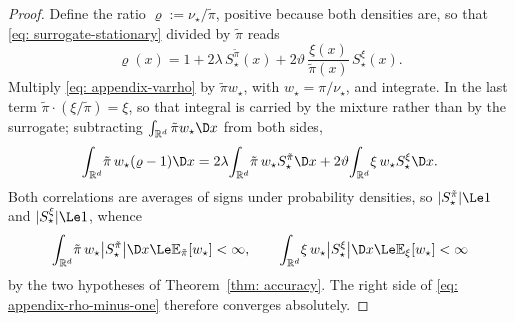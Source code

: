 \documentclass{article}
\begin{document}
\begin{proof}
Define the ratio $\varrho := \nu_\star/\tilde\pi$, positive because both densities are, so that \eqref{eq: surrogate-stationary} divided by $\tilde\pi$ reads
\begin{equation}
    \varrho(x) = 1 + 2\lambda\,S^{\tilde\pi}_\star(x) + 2\vartheta\,\frac{\xi(x)}{\tilde\pi(x)}\,S^{\xi}_\star(x) .
    \label{eq: appendix-varrho}
\end{equation}
Multiply \eqref{eq: appendix-varrho} by $\tilde\pi w_\star$, with $w_\star=\pi/\nu_\star$, and integrate. In the last term $\tilde\pi\cdot(\xi/\tilde\pi)=\xi$, so that integral is carried by the mixture rather than by the surrogate; subtracting $\int_{\mathbb R^d}\tilde\pi w_\star\D x$ from both sides,
\begin{equation}
    \int_{\mathbb R^d}\!\tilde\pi\,w_\star(\varrho-1)\D x
    = 2\lambda\!\int_{\mathbb R^d}\!\tilde\pi\,w_\star S^{\tilde\pi}_\star\D x
    + 2\vartheta\!\int_{\mathbb R^d}\!\xi\,w_\star S^{\xi}_\star\D x .
    \label{eq: appendix-rho-minus-one}
\end{equation}
Both correlations are averages of signs under probability densities, so $|S^{\tilde\pi}_\star|\Le1$ and $|S^{\xi}_\star|\Le1$, whence
\begin{equation*}
	\int_{\mathbb R^d}\!\tilde\pi\,w_\star\bigl|S^{\tilde\pi}_\star\bigr|\D x \Le \mathbb E_{\tilde\pi}[w_\star] < \infty ,
	\qquad
	\int_{\mathbb R^d}\!\xi\,w_\star\bigl|S^{\xi}_\star\bigr|\D x \Le \mathbb E_{\xi}[w_\star] < \infty
\end{equation*}
by the two hypotheses of Theorem~\ref{thm: accuracy}. The right side of \eqref{eq: appendix-rho-minus-one} therefore converges absolutely.


\end{proof}
\end{document}
